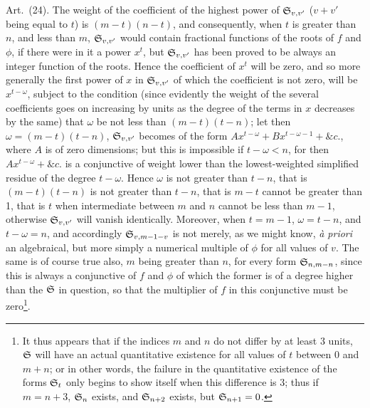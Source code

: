 \documentclass[11pt]{article}
\newcommand{\sourcepage}[1]{\marginpar{\scriptsize p.~#1}}
\newcommand{\art}[1]{\par\smallskip\noindent Art.~(#1).\quad}
\begin{document}
\sourcepage{470}
\art{24} The weight of the coefficient of the highest power of $\mathfrak{S}_{v,v'}$ ($v+v'$ being equal to $t$) is $(m-t)(n-t)$, and consequently, when $t$ is greater than $n$, and less than $m$, $\mathfrak{S}_{v,v'}$ would contain fractional functions of the roots of $f$ and $\phi$, if there were in it a power $x^t$, but $\mathfrak{S}_{v,v'}$ has been proved to be always an integer function of the roots. Hence the coefficient of $x^t$ will be zero, and so more generally the first power of $x$ in $\mathfrak{S}_{v,v'}$ of which the coefficient is not zero, will be $x^{t-\omega}$, subject to the condition (since evidently the weight of the several coefficients goes on increasing by units as the degree of the terms in $x$ decreases by the same) that $\omega$ be not less than $(m-t)(t-n)$; let then $\omega=(m-t)(t-n)$, $\mathfrak{S}_{v,v'}$ becomes of the form $Ax^{t-\omega}+Bx^{t-\omega-1}+\&c.$, where $A$ is of zero dimensions; but this is impossible if $t-\omega<n$, for then $Ax^{t-\omega}+\&c.$ is a conjunctive of weight lower than the lowest-weighted simplified residue of the degree $t-\omega$. Hence $\omega$ is not greater than $t-n$, that is $(m-t)(t-n)$ is not greater than $t-n$, that is $m-t$ cannot be greater than 1, that is $t$ when intermediate between $m$ and $n$ cannot be less than $m-1$, otherwise $\mathfrak{S}_{v,v'}$ will vanish identically. Moreover, when $t=m-1$, $\omega=t-n$, and $t-\omega=n$, and accordingly $\mathfrak{S}_{v,m-1-v}$ is not merely, as we might know, \emph{à priori} an algebraical, but more simply a numerical multiple of $\phi$ for all values of $v$. The same is of course true also, $m$ being greater than $n$, for every form $\mathfrak{S}_{n,m-n}$, since this is always a conjunctive of $f$ and $\phi$ of which the former is of a degree higher than the $\mathfrak{S}$ in question, so that the multiplier of $f$ in this conjunctive must be zero\footnote{It thus appears that if the indices $m$ and $n$ do not differ by at least 3 units, $\mathfrak{S}$ will have an actual quantitative existence for all values of $t$ between 0 and $m+n$; or in other words, the failure in the quantitative existence of the forms $\mathfrak{S}_t$ only begins to show itself when this difference is 3; thus if $m=n+3$, $\mathfrak{S}_n$ exists, and $\mathfrak{S}_{n+2}$ exists, but $\mathfrak{S}_{n+1}=0$.}.
\end{document}
